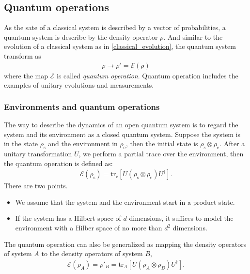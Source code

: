 \documentclass{article}
\begin{document}
\subsection{Quantum operations}

As the sate of a classical system is described by a vector of probabilities, a quantum system is describe by the density operator $\rho$. And similar to the evolution of a classical system as in \ref{classical_evolution}, the quantum system transform as
\begin{align}
	\rho \rightarrow \rho'=\mathcal{E}(\rho)
\end{align}
where the map $\mathcal{E}$ is called \textit{quantum operation}. Quantum operation includes the examples of unitary evolutions and measurements.

\subsubsection{Environments and quantum operations}
The way to describe the dynamics of an open quantum system is to regard the system and its environment as a closed quantum system. Suppose the system is in the state $\rho_{\text{s}}$ and the environment in $\rho_{\text{e}}$, then the initial state is $\rho_{\text{s}}\otimes \rho_{\text{e}}$. After a unitary transformation $U$, we perform a partial trace over the environment, then the quantum operation is defined as:
\begin{align}
	\mathcal{E}(\rho_{\text{s}})=\text{tr}_{\text{e}}[U(\rho_{\text{s}}\otimes \rho_{\text{e}})U^{\dagger}]. \label{quantum_operation}
\end{align}
There are two points. 
\begin{itemize}
	\item We assume that the system and the environment start in a product state.
	\item If the system has a Hilbert space of $d$ dimensions, it suffices to model the environment with a Hilber space of no more than $d^2$ dimensions.
\end{itemize}
The quantum operation can also be generalized as mapping the density operators of system $A$ to the density operators of system $B$,
\begin{align}
	\mathcal{E}(\rho_A)=\rho'_B=\text{tr}_A[U(\rho_A\otimes\rho_B)U^{\dagger}].
\end{align}
\end{document}
